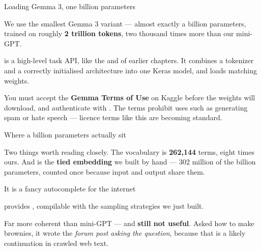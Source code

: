 \documentclass[aspectratio=169,11pt,t]{beamer}
\begin{document}
\begin{frame}[shrink=25]{Loading Gemma 3, one billion parameters}
{\fontsize{9.4}{12.6}\selectfont\color{fg2}We use the smallest Gemma 3 variant --- almost exactly a billion parameters, trained on roughly \textbf{2 trillion tokens}, two thousand times more than our mini-GPT.\par}\vskip 4pt
{\fontsize{9.4}{12.6}\selectfont\color{fg2} is a high-level task API, like the  and  of earlier chapters. It combines a tokenizer and a correctly initialised architecture into one Keras model, and loads matching weights.\par}\vskip 4pt
\begin{iband}[amber]
You must accept the \textbf{Gemma Terms of Use} on Kaggle before the weights will download, and authenticate with . The terms prohibit uses such as generating spam or hate speech --- licence terms like this are becoming standard.
\end{iband}
\end{frame}

\begin{frame}[shrink=25]{Where a billion parameters actually sit}
{\fontsize{9.4}{12.6}\selectfont\color{fg2}Two things worth reading closely. The vocabulary is \textbf{262,144} terms, eight times ours. And  is the \textbf{tied embedding} we built by hand --- 302 million of the billion parameters, counted once because input and output share them.\par}\vskip 4pt
\end{frame}

\begin{frame}[shrink=25]{It is a fancy autocomplete for the internet}
{\fontsize{9.4}{12.6}\selectfont\color{fg2} provides , compilable with the sampling strategies we just built.\par}\vskip 4pt
{\fontsize{9.4}{12.6}\selectfont\color{fg2}Far more coherent than mini-GPT --- and \textbf{still not useful}. Asked how to make brownies, it wrote the \textit{forum post asking the question}, because that is a likely continuation in crawled web text.\par}\vskip 4pt
\end{frame}
\end{document}
